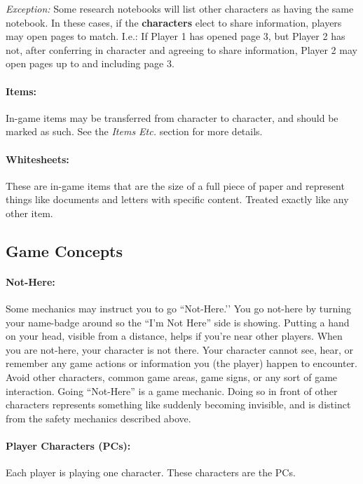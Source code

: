 \documentclass[sheet]{GL2020}
\begin{document}
\emph{Exception:} Some research notebooks will list other characters as having the same notebook. In these cases, if the \textbf{characters} elect to share information, players may open pages to match. I.e.: If Player 1 has opened page 3, but Player 2 has not, after conferring in character and agreeing to share information, Player 2 may open pages up to and including page 3.

\paragraph{Items:} In-game items may be transferred from character to character, and should be marked as such. See the \emph{Items Etc.} section for more details.

\paragraph{Whitesheets:} These are in-game items that are the size of a full piece of paper and represent things like documents and letters with specific content. Treated exactly like any other item.

\subsection{Game Concepts}

\paragraph{Not-Here:} Some mechanics may instruct you to go ``Not-Here.'’ You go not-here by turning your name-badge around so the ``I'm Not Here'' side is showing. Putting a hand on your head, visible from a distance, helps if you're near other players. When you are not-here, your character is not there. Your character cannot see, hear, or remember any game actions or information you (the player) happen to encounter. Avoid other characters, common game areas, game signs, or any sort of game interaction. Going ``Not-Here'' is a game mechanic. Doing so in front of other characters represents something like suddenly becoming invisible, and is distinct from the safety mechanics described above.

\paragraph{Player Characters (PCs):} Each player is playing one character. These characters are the PCs.
\end{document}
